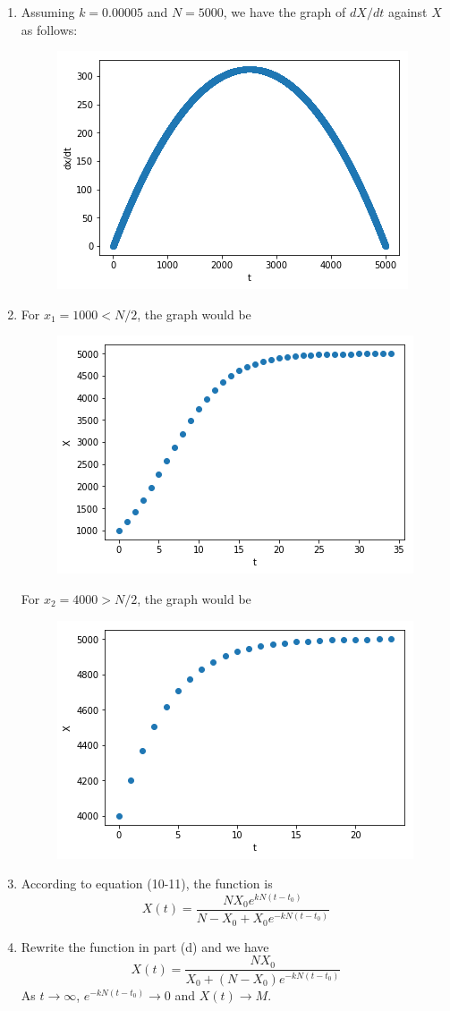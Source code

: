 \documentclass[10pt]{report}
\begin{document}
\begin{enumerate}
\begin{enumerate}
		\item 
		Assuming $k=0.00005$ and $N=5000$, we have the graph of $dX/dt$ against $X$ as follows:
		\begin{figure}[H]
			\centering
			\includegraphics[width=0.5\linewidth]{4b.png}
		\end{figure}
	
		\item 
		For $x_1 = 1000 < N/2$, the graph would be
		\begin{figure}[H]
			\centering
			\includegraphics[width=0.5\linewidth]{4c1.png}
		\end{figure}
		For $x_2 = 4000 > N/2$, the graph would be
		\begin{figure}[H]
			\centering
			\includegraphics[width=0.5\linewidth]{4c2.png}
		\end{figure}
	
		\item 
		According to equation (10-11), the function is
		\[
		X(t) = \frac{N X_0 e^{kN(t-t_0)}}{N - X_0 + X_0 e^{-kN(t-t_0)}}
		\]
		
		\item 
		Rewrite the function in part (d) and we have
		\[
		X(t) = \frac{N X_0}{X_0 + (N - X_0) e^{-kN(t-t_0)}}
		\]
		As $t \to \infty$, $e^{-kN(t-t_0)} \to 0$ and $X(t) \to M$.
		

\end{enumerate}
\end{enumerate}
\end{document}
